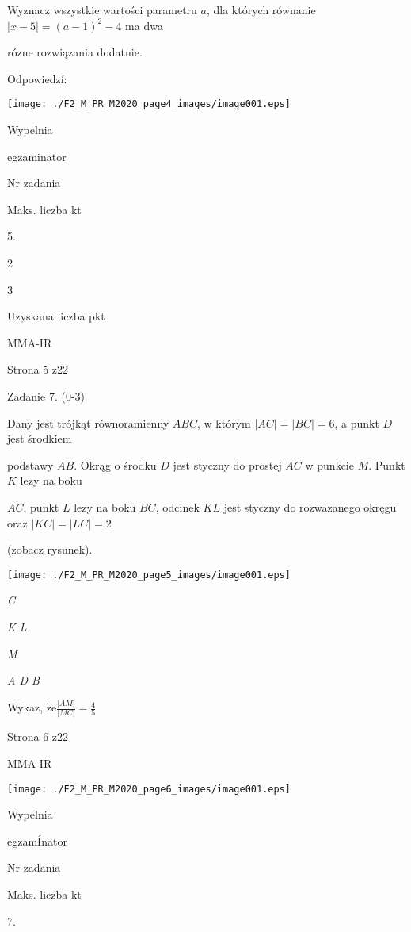 \documentclass[a4paper,12pt]{article}
\begin{document}
Wyznacz wszystkie wartości parametru $a$, dla których równanie $|x-5|=(a-1)^{2}-4$ ma dwa

rózne rozwiązania dodatnie.

Odpowiedzí:
\begin{center}
\texttt{[image: ./F2\_M\_PR\_M2020\_page4\_images/image001.eps]}
\end{center}
Wypelnia

egzaminator

Nr zadania

Maks. liczba kt

5.

2

3

Uzyskana liczba pkt

MMA-IR

Strona 5 z22





Zadanie 7. (0-3)

Dany jest trójkąt równoramienny $ABC$, w którym $|AC|=|BC|=6$, a punkt $D$ jest środkiem

podstawy $AB$. Okrąg o środku $D$ jest styczny do prostej $AC$ w punkcie $M$. Punkt $K$ lezy na boku

$AC$, punkt $L$ lezy na boku $BC$, odcinek $KL$ jest styczny do rozwazanego okręgu oraz $|KC|=|LC|=2$

(zobacz rysunek).
\begin{center}
\texttt{[image: ./F2\_M\_PR\_M2020\_page5\_images/image001.eps]}
\end{center}
{\it C}

{\it K  L}

{\it M}

{\it A  D  B}

Wykaz, $\displaystyle \dot{\mathrm{z}}\mathrm{e}\frac{|AM|}{|MC|}=\frac{4}{5}$

Strona 6 z22

MMA-IR




\begin{center}
\texttt{[image: ./F2\_M\_PR\_M2020\_page6\_images/image001.eps]}
\end{center}
Wypelnia

egzamÍnator

Nr zadania

Maks. liczba kt

7.
\end{document}
